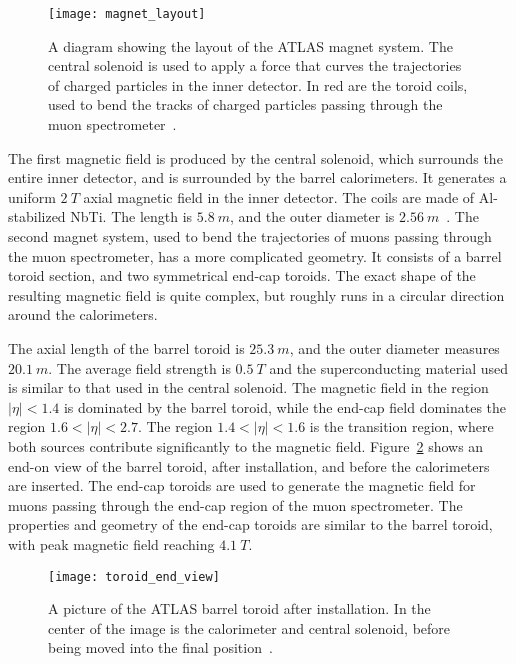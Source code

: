 \begin{figure}[!ht]\centering
\texttt{[image: magnet\_layout]}
\caption{A diagram showing the layout of the ATLAS magnet system.
The central solenoid is used to apply a force that curves the trajectories of charged particles in the inner detector.
In red are the toroid coils, used to bend the tracks of charged particles passing through the muon spectrometer~\cite{atlas-detector-2008}.}
\label{fig:magnet_layout}
\end{figure}

The first magnetic field is produced by the central solenoid, which surrounds the entire inner detector, and is surrounded by the barrel calorimeters.
It generates a uniform $2~T$ axial magnetic field in the inner detector.
The coils are made of Al-stabilized NbTi. The length is $5.8~m$, and the outer diameter is $2.56~m$~\cite{atlas-detector-2008}.
The second magnet system, used to bend the trajectories of muons passing through the muon spectrometer, has a more complicated geometry.
It consists of a barrel toroid section, and two symmetrical end-cap toroids.
The exact shape of the resulting magnetic field is quite complex, but roughly runs in a circular direction around the calorimeters.

The axial length of the barrel toroid is $25.3~m$, and the outer diameter measures $20.1~m$.
The average field strength is $0.5~T$ and the superconducting material used is similar to that used in the central solenoid\cite{atlas-detector-2008}.
The magnetic field in the region $|\eta|<1.4$ is dominated by the barrel toroid, while the end-cap field dominates the region $1.6 < |\eta| < 2.7$.
The region $1.4 < |\eta| < 1.6$ is the transition region, where both sources contribute significantly to the magnetic field.
Figure~\ref{fig:toroid_end_view} shows an end-on view of the barrel toroid, after installation, and before the calorimeters are inserted.
The end-cap toroids are used to generate the magnetic field for muons passing through the end-cap region of the muon spectrometer.
The properties and geometry of the end-cap toroids are similar to the barrel toroid,
with peak magnetic field reaching $4.1~T$\cite{atlas-detector-2008}.

\begin{figure}[!ht]\centering
\texttt{[image: toroid\_end\_view]}
\caption{A picture of the ATLAS barrel toroid after installation.
In the center of the image is the calorimeter and central solenoid, before being moved into the final position~\cite{atlas-detector-2008}.}
\label{fig:toroid_end_view}
\end{figure}

